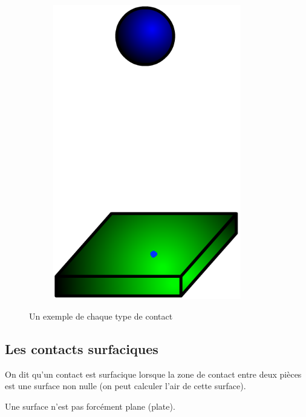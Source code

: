 \documentclass[10pt,fleqn,draft]{article} %
\begin{document}
\begin{figure}[h]
\begin{subfigure}[b]{0.3\textwidth}
    \includegraphics[width=0.9\textwidth,height=.2\textheight,keepaspectratio]{images/sphere-plan}
    \caption{}
  \end{subfigure}\hfill
  \caption{Un exemple de chaque type de contact}
  \label{fig:type_contact}
\end{figure}
\subsection{Les contacts surfaciques}

\begin{defi}
  On dit qu'un contact est surfacique lorsque la zone de contact entre deux pièces est une surface non nulle (on peut calculer l'air de cette surface).
\end{defi}

\begin{warn}
  Une surface n'est pas forcément plane (plate).
\end{warn}
\end{document}
